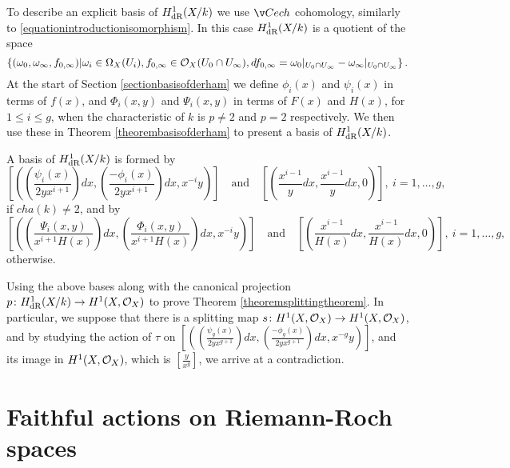 To describe an explicit basis of $H_{\text {dR}}^1(X/k)$ we use $\cech$ cohomology, similarly to \eqref{equationintroductionisomorphism}.
In this case $H_{\text {dR}}^1(X/k)$ is a quotient of the space 
    \begin{equation*}
    \left\{(\omega_0, \omega_\infty, f_{0,\infty}) | \omega_i\in \Omega_X(U_i), f_{0,\infty}\in {\cal O}_X(U_0 \cap U_\infty), df_{0,\infty} = \omega_0|_{U_0\cap U_\infty} - \omega_\infty|_{U_0\cap U_\infty} \right\}.
    \end{equation*}
At the start of Section \ref{sectionbasisofderham} we define $\phi_i(x)$ and $\psi_i(x)$ in terms of $f(x)$, and $\Phi_i(x,y)$ and $\Psi_i(x,y)$ in terms of $F(x)$ and $H(x)$, for $1 \leq i \leq g$, when the characteristic of $k$ is $p \neq 2$ and $p = 2$ respectively.
We then use these in Theorem \ref{theorembasisofderham} to present a basis of $H_{\text {dR}}^1(X/k)$.
    
    \begin{unnumthm}\label{theorembasisofderham}
    A basis of $H_{\text {dR}}^1(X/k)$ is formed by 
        \begin{equation*}
         \left[ \left( \left( \frac{\psi_i(x)}{2yx^{i+1}}\right) dx, \left(\frac{-\phi_i(x)}{2yx^{i+1}}\right) dx, x^{-i}y \right)\right] 
    \quad \text{and} \quad
         \left[ \left( \frac{x^{i-1}}{y} dx , \frac{x^{i-1}}{y} dx, 0 \right)\right] ,\ i = 1,\ldots ,g,
        \end{equation*}
   if $cha(k) \neq 2$, and by 
        \begin{equation*}
        \left[ \left( \left(\frac{\Psi_i(x,y)}{x^{i+1}H(x)}\right) dx, \left( \frac{\Phi_i(x,y)}{x^{i+1}H(x)} \right) dx, x^{-i}y \right)\right] 
    \quad \text{and} \quad
        \left[ \left( \frac{x^{i-1}}{H(x)} dx, \frac{x^{i-1}}{H(x)} dx, 0 \right)\right],\ i=1, \ldots, g,
        \end{equation*}
    otherwise.
    \end{unnumthm}

Using the above bases along with the canonical projection $p\colon H_{\text {dR}}^1(X/k) \rightarrow H^1(X,\mathcal{O}_X)$ to prove Theorem \ref{theoremsplittingtheorem}.
In particular, we suppose that there is a splitting map $s \colon H^1(X,\mathcal{O}_X) \rightarrow H^1(X,\mathcal{O}_X)$, and by studying the action of $\tau$ on $\left[ \left( \left( \frac{\psi_g(x)}{2yx^{g+1}}\right) dx, \left(\frac{-\phi_g(x)}{2yx^{g+1}}\right) dx, x^{-g}y \right)\right]$, and its image in $H^1(X,\mathcal{O}_X)$, which is $\left[ \frac{y}{x^g} \right]$, we arrive at a contradiction.



 \section{Faithful actions on Riemann-Roch spaces}

